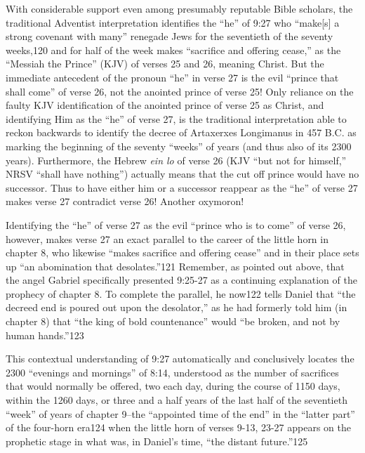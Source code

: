 With considerable support even among presumably reputable Bible scholars,
the traditional Adventist interpretation identifies the ``he'' of 9:27 who
``make[s] a strong covenant with many'' renegade Jews for the seventieth of 
the seventy weeks,120 and for half of the week makes ``sacrifice and
offering cease,'' as the ``Messiah the Prince'' (KJV) of verses 25 and 26,
meaning Christ. But the immediate antecedent of the pronoun ``he'' in verse 27
is the evil ``prince that shall come'' of verse 26, not the anointed prince of
verse 25! Only reliance on the faulty KJV identification of the anointed
prince of verse 25 as Christ, and identifying Him as the ``he'' of verse 27,
is the traditional interpretation able to reckon backwards to identify the
decree of Artaxerxes Longimanus in 457 B.C. as marking the beginning of the
seventy ``weeks'' of years (and thus also of its 2300 years). Furthermore, the
Hebrew \textit{ein lo} of verse 26 (KJV ``but not for himself,'' NRSV ``shall have
nothing'') actually means that the cut off prince would have no successor.
Thus to have either him or a successor reappear as the ``he'' of verse 27
makes verse 27 contradict verse 26! Another oxymoron!

Identifying the ``he'' of verse 27 as the evil ``prince who is to come'' of
verse 26, however, makes verse 27 an exact parallel to the career of the
little horn in chapter 8, who likewise ``makes sacrifice and offering cease''
and in their place sets up ``an abomination that desolates.''121 Remember, as
pointed out above, that the angel Gabriel specifically presented 9:25-27 as
a continuing explanation of the prophecy of chapter 8. To complete the
parallel, he now122 tells Daniel that ``the decreed end is poured out upon
the desolator,'' as he had formerly told him (in chapter 8) that ``the king of
bold countenance'' would ``be broken, and not by human hands.''123

This contextual understanding of 9:27 automatically and conclusively locates
the 2300 ``evenings and mornings'' of 8:14, understood as the number of
sacrifices that would normally be offered, two each day, during the course
of 1150 days, within the 1260 days, or three and a half years of the last
half of the seventieth ``week'' of years of chapter 9--the ``appointed time of
the end'' in the ``latter part'' of the four-horn era124 when the little horn
of verses 9-13, 23-27 appears on the prophetic stage in what was, in
Daniel's time, ``the distant future.''125
